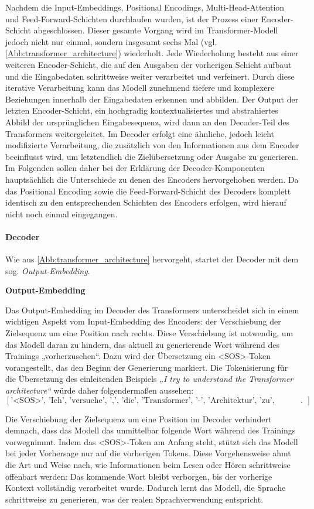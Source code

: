 Nachdem die Input-Embeddings, Positional Encodings, Multi-Head-Attention und Feed-Forward-Schichten durchlaufen wurden, ist der Prozess einer Encoder-Schicht abgeschlossen. Dieser gesamte Vorgang wird im Transformer-Modell jedoch nicht nur einmal, sondern insgesamt sechs Mal (vgl. \cref{Abb:transformer_architecture}) wiederholt. Jede Wiederholung besteht aus einer weiteren Encoder-Schicht, die auf den Ausgaben der vorherigen Schicht aufbaut und die Eingabedaten schrittweise weiter verarbeitet und verfeinert. Durch diese iterative Verarbeitung kann das Modell zunehmend tiefere und komplexere Beziehungen innerhalb der Eingabedaten erkennen und abbilden. Der Output der letzten Encoder-Schicht, ein hochgradig kontextualisiertes und abstrahiertes Abbild der ursprünglichen Eingabesequenz, wird dann an den Decoder-Teil des Transformers weitergeleitet. Im Decoder erfolgt eine ähnliche, jedoch leicht modifizierte Verarbeitung, die zusätzlich von den Informationen aus dem Encoder beeinflusst wird, um letztendlich die Zielübersetzung oder Ausgabe zu generieren. Im Folgenden sollen daher bei der Erklärung der Decoder-Komponenten hauptsächlich die Unterschiede zu denen des Encoders hervorgehoben werden. Da das Positional Encoding sowie die Feed-Forward-Schicht des Decoders komplett identisch zu den entsprechenden Schichten des Encoders erfolgen, wird hierauf nicht noch einmal eingegangen.

\paragraph{Decoder}
Wie aus \cref{Abb:transformer_architecture} hervorgeht, startet der Decoder mit dem sog. \emph{Output-Embedding}.

\textbf{Output-Embedding}

Das Output-Embedding im Decoder des Transformers unterscheidet sich in einem wichtigen Aspekt vom Input-Embedding des Encoders: der Verschiebung der Zielsequenz um eine Position nach rechts. Diese Verschiebung ist notwendig, um das Modell daran zu hindern, das aktuell zu generierende Wort während des Trainings „vorherzusehen“. Dazu wird der Übersetzung ein <SOS>-Token vorangestellt, das den Beginn der Generierung markiert. Die Tokenisierung für die Übersetzung des einleitenden Beispiels \emph{„I try to understand the Transformer architecture“} würde daher folgendermaßen aussehen:
$$[\text{'<SOS>', 'Ich', 'versuche', ',', 'die', 'Transformer', '-', 'Architektur', 'zu', 'verstehen'}].$$

Die Verschiebung der Zielsequenz um eine Position im Decoder verhindert demnach, dass das Modell das unmittelbar folgende Wort während des Trainings vorwegnimmt. Indem das <SOS>-Token am Anfang steht, stützt sich das Modell bei jeder Vorhersage nur auf die vorherigen Tokens. Diese Vorgehensweise ahmt die Art und Weise nach, wie Informationen beim Lesen oder Hören schrittweise offenbart werden: Das kommende Wort bleibt verborgen, bis der vorherige Kontext vollständig verarbeitet wurde. Dadurch lernt das Modell, die Sprache schrittweise zu generieren, was der realen Sprachverwendung entspricht.

